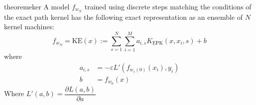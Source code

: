 \begin{restatable}{theorem}{eker}
\label{thm:eker}
A model $f_{w_N}$ trained using discrete steps matching the conditions of the exact path kernel has the following exact representation as an ensemble of $N$ kernel machines:
\begin{equation}
f_{w_N} = \text{KE}(x) :=  \sum_{s = 1}^N \sum_{i = 1}^{M} a_{i,s} K_{\text{EPK}}(x, x_i, s) + b
\label{ensemble}
\end{equation}
where
\begin{align}
a_{i, s} &= -\varepsilon  L'(f_{w_s(0)}(x_i),  y_i) \\
b &= f_{w_0}(x)
\end{align}
Where $L'(a, b) = \dfrac{\partial L(a, b)}{\partial a}$
\end{restatable}

